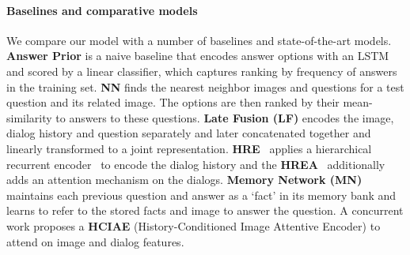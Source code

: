 \documentclass[10pt,twocolumn,letterpaper]{article}
\begin{document}
\paragraph{Baselines and comparative models}
We compare our model with a number of baselines and state-of-the-art models. \textbf{Answer Prior} \cite{das2016visual} is a naive baseline that encodes answer options with an LSTM and scored by a linear classifier, which captures ranking by frequency of answers in the training set. \textbf{NN} \cite{das2016visual} finds the nearest neighbor images and questions for a test question and its related image. The options are then ranked by their mean-similarity to answers to these questions. \textbf{Late Fusion (LF)} \cite{das2016visual} encodes the image, dialog history and question separately and later concatenated together and linearly transformed to a joint representation. \textbf{HRE}~\cite{das2016visual} applies a hierarchical recurrent encoder~\cite{serban2017hierarchical} to encode the dialog history and the \textbf{HREA}~\cite{das2016visual} additionally adds an attention mechanism on the dialogs. \textbf{Memory Network (MN)}~\cite{das2016visual} maintains each previous question and answer as a `fact' in its memory bank and learns to refer to the stored facts and image to answer the question. A concurrent work \cite{lu2017best} proposes a \textbf{HCIAE} (History-Conditioned Image Attentive Encoder) to attend on image and dialog features.
\end{document}
